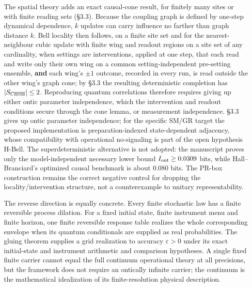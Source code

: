 \documentclass[
]{article}
\begin{document}
The spatial theory adds an exact causal-cone result, for finitely many
sites or with finite reading sets (§3.3). Because the coupling graph is
defined by one-step dynamical dependence, \(k\) updates can carry
influence no farther than graph distance \(k\). Bell locality then
follows, on a finite site set and for the nearest-neighbour cubic update
with finite wing and readout regions on a site set of any cardinality,
when settings are interventions, applied at one step, that each read and
write only their own wing on a common setting-independent pre-setting
ensemble, \textbf{and} each wing's \(\pm1\) outcome, recorded in every
run, is read outside the other wing's graph cone; by §3.3 the resulting
deterministic completion has \(|S_{\rm CHSH}|\le2\). Reproducing quantum
correlations therefore requires giving up either ontic parameter
independence, which the intervention and readout conditions secure
through the cone lemma, or measurement independence. §3.3 gives up ontic
parameter independence; for the specific SM/GR target the proposed
implementation is preparation-indexed state-dependent adjacency, whose
compatibility with operational no-signaling is part of the open
hypothesis H-Bell. The superdeterministic alternative is not adopted:
the manuscript proves only the model-independent necessary lower bound
\(I_{\rm ont}\ge0.0309\) bits, while Hall--Branciard's optimized causal
benchmark is about \(0.080\) bits. The PR-box construction remains the
correct negative control for dropping the locality/intervention
structure, not a counterexample to unitary representability.

The reverse direction is equally concrete. Every finite stochastic law
has a finite reversible process dilation. For a fixed initial state,
finite instrument menu and finite horizon, one finite reversible
response table realizes the whole corresponding envelope when its
quantum conditionals are supplied as real probabilities. The gluing
theorem supplies a grid realization to accuracy \(\varepsilon>0\) under
its exact initial-state and instrument arithmetic and comparison
hypotheses. A single fixed finite carrier cannot equal the full
continuum operational theory at all precisions, but the framework does
not require an ontically infinite carrier; the continuum is the
mathematical idealization of its finite-resolution physical description.
\end{document}

